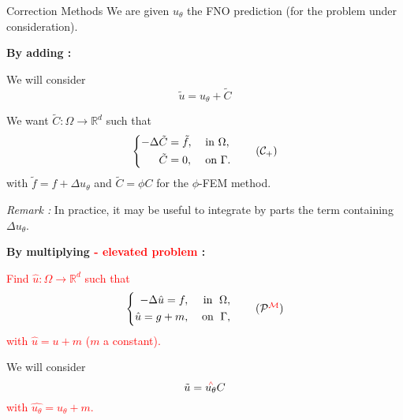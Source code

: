\begin{frame}[noframenumbering]{Correction Methods}
    We are given $u_\theta$ the FNO prediction (for the problem under consideration).
    
    \begin{minipage}{0.48\linewidth}
        \textbf{By adding :}
    
        We will consider
        \begin{equation*}
            \tilde{u}=u_\theta+\tilde{C}
        \end{equation*}

        We want $\tilde{C}: \Omega \rightarrow \mathbb{R}^d$ such that
        \begin{equation}
            \left\{\begin{aligned}
                -\Delta \tilde{C}&=\tilde{f}, \; &&\text{in } \Omega, \\
                \tilde{C}&=0, \; &&\text{on } \Gamma.
            \end{aligned}\right. \tag{$\mathcal{C}_{+}$} \label{corr_add}
        \end{equation}
        with $\tilde{f}=f+\Delta u_\theta$ and $\tilde{C}=\phi C$ for the $\phi$-FEM method.
        
        \small
        \textit{Remark :} In practice, it may be useful to integrate by parts the term containing $\Delta u_\theta$.
    \end{minipage} \quad
    \begin{minipage}{0.48\linewidth}
        \textbf{By multiplying \textcolor{red}{- elevated problem} :}
        
        \small
        \textcolor{red}{Find $\hat{u} : \Omega \rightarrow \mathbb{R}^d$ such that
		\begin{equation}
			\left\{
			\begin{aligned}
				-\Delta \hat{u} = f, \; &&\text{in } \; \Omega, \\
				\hat{u}=g+m, \; &&\text{on } \; \Gamma,
			\end{aligned}
			\right. \tag{$\mathcal{P}^{\mathcolor{red}{\mathcal{M}}}$} \label{pb_reh}
		\end{equation}
		with $\hat{u}=u+m$ ($m$ a constant).}

        \normalsize
        We will consider
        \begin{equation*}
            \tilde{u}=\accentset{\textcolor{red}{\wedge}}{u_\theta} C
        \end{equation*}
        \textcolor{red}{with $\hat{u_\theta}=u_\theta+m$.}
        

\end{minipage}
\end{frame}
